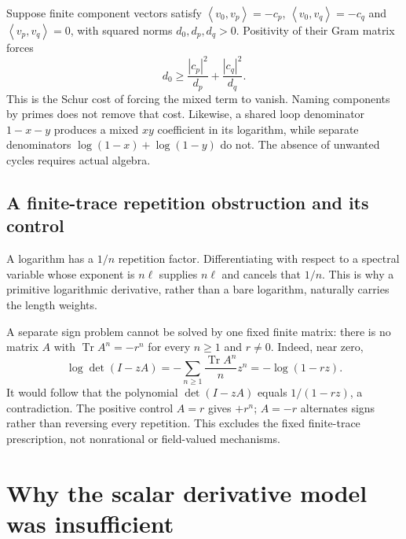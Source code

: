\documentclass[11pt]{article}
\numberwithin{equation}{section}
\theoremstyle{definition}
\theoremstyle{remark}
\newcommand{\ip}[2]{\left\langle#1,#2\right\rangle}
\begin{document}
Suppose finite component vectors satisfy
$\ip{v_0}{v_p}=-c_p$, $\ip{v_0}{v_q}=-c_q$ and $\ip{v_p}{v_q}=0$, with squared norms $d_0,d_p,d_q>0$. Positivity of their Gram matrix forces
\begin{equation}
 d_0\ge\frac{|c_p|^2}{d_p}+\frac{|c_q|^2}{d_q}.
\end{equation}
This is the Schur cost of forcing the mixed term to vanish. Naming components by primes does not remove that cost. Likewise, a shared loop denominator $1-x-y$ produces a mixed $xy$ coefficient in its logarithm, while separate denominators $\log(1-x)+\log(1-y)$ do not. The absence of unwanted cycles requires actual algebra.

\subsection{A finite-trace repetition obstruction and its control}
A logarithm has a $1/n$ repetition factor. Differentiating with respect to a spectral variable whose exponent is $n\ell$ supplies $n\ell$ and cancels that $1/n$. This is why a primitive logarithmic derivative, rather than a bare logarithm, naturally carries the length weights.

A separate sign problem cannot be solved by one fixed finite matrix: there is no matrix $A$ with $\operatorname{Tr}A^n=-r^n$ for every $n\ge1$ and $r\ne0$. Indeed, near zero,
\begin{equation}
 \log\det(I-zA)=-\sum_{n\ge1}\frac{\operatorname{Tr}A^n}{n}z^n
 =-\log(1-rz).
\end{equation}
It would follow that the polynomial $\det(I-zA)$ equals $1/(1-rz)$, a contradiction. The positive control $A=r$ gives $+r^n$; $A=-r$ alternates signs rather than reversing every repetition. This excludes the fixed finite-trace prescription, not nonrational or field-valued mechanisms.

\section{Why the scalar derivative model was insufficient}
\label{sec:scalar}
\end{document}
